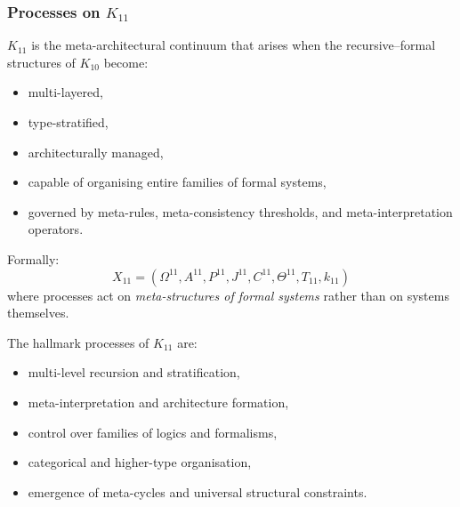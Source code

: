 

\subsubsection{Processes on $K_{11}$}
\label{sec:processes-k11}

$K_{11}$ is the meta-architectural continuum that arises when the
recursive–formal structures of $K_{10}$ become:
\begin{itemize}
    \item multi-layered,
    \item type-stratified,
    \item architecturally managed,
    \item capable of organising entire families of formal systems,
    \item governed by meta-rules, meta-consistency thresholds, 
          and meta-interpretation operators.
\end{itemize}

Formally:
\[
X_{11} = (\Omega^{11}, A^{11}, P^{11}, J^{11}, 
          C^{11}, \Theta^{11}, T_{11}, k_{11})
\]
where processes act on \emph{meta-structures of formal systems} rather 
than on systems themselves.

The hallmark processes of $K_{11}$ are:
\begin{itemize}
    \item multi-level recursion and stratification,
    \item meta-interpretation and architecture formation,
    \item control over families of logics and formalisms,
    \item categorical and higher-type organisation,
    \item emergence of meta-cycles and universal structural constraints.
\end{itemize}

